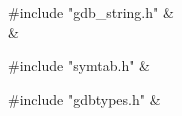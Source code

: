 \medskip
\begin{cxreftabi}
{\stt \#include "gdb\_string.h"} &\\
\hspace*{0.2in}{\stt \#include <string.h>} &\\
\end{cxreftabi}

\medskip
\begin{cxreftabi}
{\stt \#include "symtab.h"} &\\
\end{cxreftabi}

\medskip
\begin{cxreftabi}
{\stt \#include "gdbtypes.h"} &\\
\end{cxreftabi}

